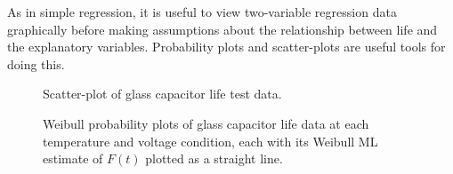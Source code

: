 As in simple regression, it is useful to view two-variable
regression data graphically before making assumptions about the
relationship between life and the explanatory variables.
Probability plots and scatter-plots are useful tools for doing this.

\begin{figure}
\caption{Scatter-plot of glass capacitor life test data.}
\label{figure:zelencap.scatter.ps}
\end{figure}
\begin{figure}
\caption{Weibull probability plots of glass capacitor life data
at each temperature and voltage condition, each with
its Weibull ML estimate of $F(t)$ plotted as a straight line.}
\label{figure:zelencap.groupi.ps}
\end{figure}
